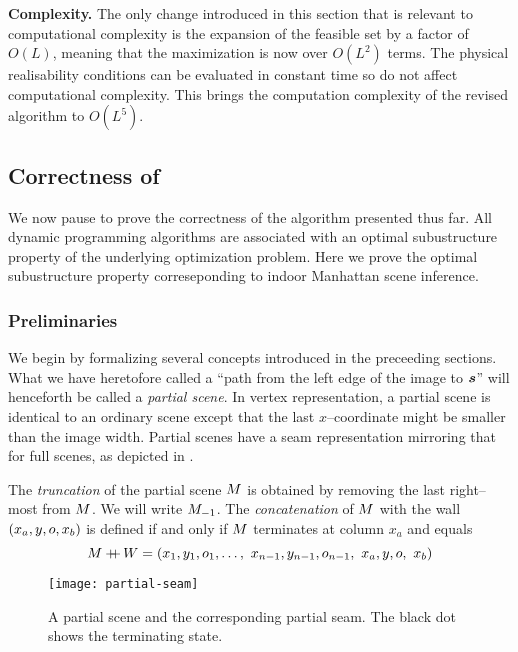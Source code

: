 \textbf{Complexity.} The only change introduced in this section that
is relevant to computational complexity is the expansion of the
feasible set by a factor of $O(L)$, meaning that the maximization
 is now over $O(L^2)$ terms. The
physical realisability conditions can be evaluated in constant time so
do not affect computational complexity. This brings the computation
complexity of the revised algorithm to $O(L^5)$.

\subsection{Correctness of }

We now pause to prove the correctness of the algorithm presented thus
far. All dynamic programming algorithms are associated with an optimal
subustructure property of the underlying optimization problem. Here we
prove the optimal subustructure property correseponding to indoor
Manhattan scene inference.

\subsubsection{Preliminaries}

We begin by formalizing several concepts introduced in the preceeding
sections. What we have heretofore called a ``path from the left edge
of the image to $\State$'' will henceforth be called a \textit{partial
  scene}. In vertex representation, a partial scene is identical to an
ordinary scene except that the last $x$--coordinate might be smaller
than the image width. Partial scenes have a seam representation
mirroring that for full scenes, as depicted in .

The \textit{truncation} of the partial scene $\PartialScene$ is
obtained by removing the last right--most from $\PartialScene$. We
will write $\PartialScene_{-1}$. The \textit{concatenation} of 
$\PartialScene$ with the wall $(x_a,y,\WallOrient,x_b)$ is
defined if and only if $\PartialScene$ terminates at column $x_a$ and
equals
\begin{equation}
  \PartialScene \concat \Wall = 
  ( x_1,y_1,\WallOrient_1,
  \ldots,
  ~x_{n-1},y_{n-1},\WallOrient_{n-1},
  ~x_a, y, \WallOrient, ~ x_b )
\end{equation}

\begin{figure}[tb]
  \centering
  \texttt{[image: partial-seam]}
  \caption{A partial scene and the corresponding partial seam. The
    black dot shows the terminating state.}
  \label{fig:partial-seam}
\end{figure}

